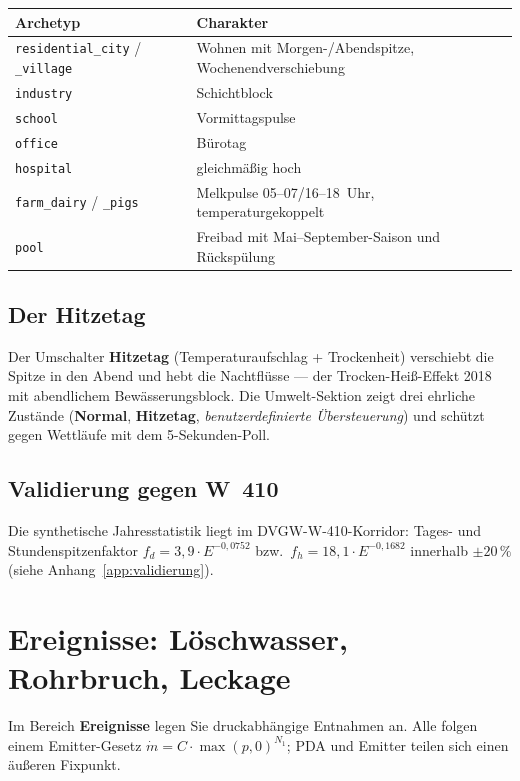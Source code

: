 \documentclass[11pt,a4paper,parskip=half]{scrreprt}
\newcommand{\ui}[1]{\textsf{\bfseries #1}}      %
\begin{document}
\begin{center}
\small
\begin{tabularx}{\linewidth}{@{}lX@{}}
\toprule
Archetyp & Charakter \\
\midrule
\texttt{residential\_city} / \texttt{\_village} & Wohnen mit Morgen-/Abendspitze, Wochenendverschiebung \\
\texttt{industry} & Schichtblock \\
\texttt{school} & Vormittagspulse \\
\texttt{office} & Bürotag \\
\texttt{hospital} & gleichmäßig hoch \\
\texttt{farm\_dairy} / \texttt{\_pigs} & Melkpulse 05--07/16--18~Uhr, temperaturgekoppelt \\
\texttt{pool} & Freibad mit Mai--September-Saison und Rückspülung \\
\bottomrule
\end{tabularx}
\end{center}

\section{Der Hitzetag}
Der Umschalter \ui{Hitzetag} (Temperaturaufschlag + Trockenheit) verschiebt die
Spitze in den Abend und hebt die Nachtflüsse — der Trocken-Heiß-Effekt 2018 mit
abendlichem Bewässerungsblock. Die Umwelt-Sektion zeigt drei ehrliche Zustände
(\ui{Normal}, \ui{Hitzetag}, \emph{benutzerdefinierte Übersteuerung}) und
schützt gegen Wettläufe mit dem 5-Sekunden-Poll.

\section{Validierung gegen W~410}
Die synthetische Jahresstatistik liegt im DVGW-W-410-Korridor: Tages- und
Stundenspitzenfaktor $f_d = 3{,}9\cdot E^{-0{,}0752}$ bzw.\
$f_h = 18{,}1\cdot E^{-0{,}1682}$ innerhalb $\pm20\,\%$ (siehe
Anhang~\ref{app:validierung}).

\chapter{Ereignisse: Löschwasser, Rohrbruch, Leckage}
\label{ch:ereignisse}

Im Bereich \ui{Ereignisse} legen Sie druckabhängige Entnahmen an. Alle folgen
einem Emitter-Gesetz $\dot m = C\cdot\max(p,0)^{N_1}$; PDA und Emitter teilen sich
einen äußeren Fixpunkt.
\end{document}

